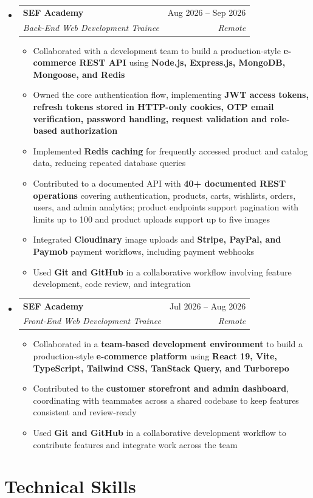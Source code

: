 \documentclass[letterpaper,11pt]{article}
\makeatletter
\newcommand{\resumeItem}[1]{ \item\small{ {#1 \vspace{-2pt}} } }
\newcommand{\resumeSubheading}[4]{
  \vspace{-2pt}\item
  \begin{tabular*}{0.97\textwidth}[t]{l@{\extracolsep{\fill}}r} \textbf{#1} & #2
  \\ \textit{\small#3} & \textit{\small #4} \\ \end{tabular*}\vspace{-7pt}
}
\newcommand{\resumeSubHeadingListStart}{\begin{itemize}[
    leftmargin=0.15in,
    label={}
  ]}
\newcommand{\resumeSubHeadingListEnd}{\end{itemize}}
\newcommand{\resumeItemListStart}{\begin{itemize}}
\newcommand{\resumeItemListEnd}{\end{itemize}\vspace{-5pt}}
\makeatother
\begin{document}
\resumeSubHeadingListStart
\resumeSubheading
{SEF Academy}{Aug 2026 -- Sep 2026}
{Back-End Web Development Trainee}{Remote}
\resumeItemListStart
\resumeItem{Collaborated with a development team to build a production-style
  \textbf{e-commerce REST API} using
  \textbf{Node.js, Express.js, MongoDB, Mongoose, and Redis}}
\resumeItem{Owned the core authentication flow, implementing
  \textbf{
    JWT access tokens, refresh tokens stored in HTTP-only cookies, OTP email
    verification, password handling, request validation and role-based
    authorization
  }}
\resumeItem{Implemented \textbf{Redis caching} for frequently accessed product
  and catalog data, reducing repeated database queries}
\resumeItem{Contributed to a documented API with
  \textbf{40+ documented REST operations} covering authentication, products,
  carts, wishlists, orders, users, and admin analytics; product endpoints
  support pagination with limits up to 100 and product uploads support up to
  five images}
\resumeItem{Integrated \textbf{Cloudinary} image uploads and
  \textbf{Stripe, PayPal, and Paymob} payment workflows, including payment
  webhooks}
\resumeItem{Used \textbf{Git and GitHub} in a collaborative workflow involving
  feature development, code review, and integration}
\resumeItemListEnd
\resumeSubheading
{SEF Academy}{Jul 2026 -- Aug 2026}
{Front-End Web Development Trainee}{Remote}
\resumeItemListStart
  \resumeItem{Collaborated in a \textbf{team-based development environment} to
    build a production-style \textbf{e-commerce platform} using
    \textbf{
      React 19, Vite, TypeScript, Tailwind CSS, TanStack Query, and Turborepo
    }}
  \resumeItem{Contributed to the
    \textbf{customer storefront and admin dashboard}, coordinating with
    teammates across a shared codebase to keep features consistent and
    review-ready}
  \resumeItem{Used \textbf{Git and GitHub} in a collaborative development
    workflow to contribute features and integrate work across the team}
  \resumeItemListEnd
\resumeSubHeadingListEnd

\section{Technical Skills}
\end{document}
